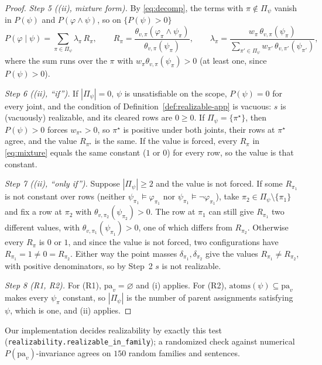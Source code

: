 \documentclass{article} %
\newcommand{\pa}{\mathrm{pa}}
\newcommand{\atoms}{\mathrm{atoms}}
\begin{document}
\begin{proof}
\emph{Step 5 ((ii), mixture form).} By \eqref{eq:decomp}, the terms with $\pi\notin\Pi_\psi$ vanish in
$P(\psi)$ and $P(\varphi\wedge\psi)$, so on $\{P(\psi)>0\}$
\begin{equation}\label{eq:mixture}
  P(\varphi\mid\psi)=\sum_{\pi\in\Pi_\psi}\lambda_\pi\,R_\pi,\qquad
  R_\pi=\frac{\theta_{v,\pi}(\varphi_\pi\wedge\psi_\pi)}{\theta_{v,\pi}(\psi_\pi)},\qquad
  \lambda_\pi=\frac{w_\pi\,\theta_{v,\pi}(\psi_\pi)}{\sum_{\pi'\in\Pi_\psi}w_{\pi'}\,\theta_{v,\pi'}(\psi_{\pi'})},
\end{equation}
where the sum runs over the $\pi$ with $w_\pi\theta_{v,\pi}(\psi_\pi)>0$ (at least one, since
$P(\psi)>0$).

\emph{Step 6 ((ii), ``if'').} If $|\Pi_\psi|=0$, $\psi$ is unsatisfiable on the scope, $P(\psi)=0$ for
every joint, and the condition of Definition~\ref{def:realizable-app} is vacuous: $s$ is (vacuously)
realizable, and its cleared rows are $0\ge0$. If $\Pi_\psi=\{\pi^\star\}$, then $P(\psi)>0$ forces
$w_{\pi^\star}>0$, so $\pi^\star$ is positive under both joints, their rows at $\pi^\star$ agree, and
the value $R_{\pi^\star}$ is the same. If the value is forced, every $R_\pi$ in \eqref{eq:mixture}
equals the same constant ($1$ or $0$) for every row, so the value is that constant.

\emph{Step 7 ((ii), ``only if'').} Suppose $|\Pi_\psi|\ge2$ and the value is not forced. If some
$R_{\pi_1}$ is not constant over rows (neither $\psi_{\pi_1}\models\varphi_{\pi_1}$ nor
$\psi_{\pi_1}\models\lnot\varphi_{\pi_1}$), take $\pi_2\in\Pi_\psi\setminus\{\pi_1\}$ and fix a row at
$\pi_2$ with $\theta_{v,\pi_2}(\psi_{\pi_2})>0$. The row at $\pi_1$ can still give $R_{\pi_1}$ two
different values, with $\theta_{v,\pi_1}(\psi_{\pi_1})>0$, one of which differs from $R_{\pi_2}$.
Otherwise every $R_\pi$ is $0$ or $1$, and since the value is not forced, two configurations have
$R_{\pi_1}=1\ne0=R_{\pi_2}$. Either way the point masses $\delta_{\pi_1},\delta_{\pi_2}$ give the
values $R_{\pi_1}\ne R_{\pi_2}$, with positive denominators, so by Step~2 $s$ is not realizable.

\emph{Step 8 (R1, R2).} For (R1), $\pa_v=\varnothing$ and (i) applies. For (R2),
$\atoms(\psi)\subseteq\pa_v$ makes every $\psi_\pi$ constant, so $|\Pi_\psi|$ is the number of parent
assignments satisfying $\psi$, which is one, and (ii) applies.
\end{proof}

Our implementation decides realizability by exactly this test
(\texttt{realizability.realizable\_in\_family}); a randomized check against numerical
$P(\pa_v)$-invariance agrees on $150$ random families and sentences.
\end{document}
